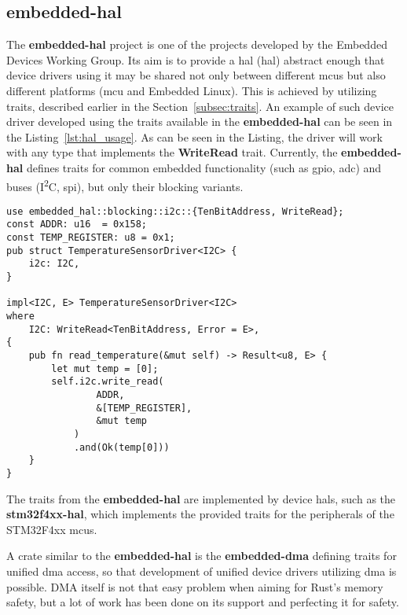 \subsection{embedded-hal}
\label{subsec:embedded_hal}
The \textbf{embedded-hal} project\cite{rust_embedded_devices_wg_rust-embeddedembedded-hal_2021} is one of the projects developed by the Embedded Devices Working Group.
Its aim is to provide a \acs{hal} (\acl{hal}) abstract enough that device drivers using it may be shared not only between different \acs{mcu}s but also different platforms (\acs{mcu} and Embedded Linux).
This is achieved by utilizing traits, described earlier in the Section~\ref{subsec:traits}.
An example of such device driver developed using the traits available in the \textbf{embedded-hal} can be seen in the Listing~\ref{lst:hal_usage}.
As can be seen in the Listing, the driver will work with any type that implements the \textbf{WriteRead} trait.
Currently, the \textbf{embedded-hal} defines traits for common embedded functionality (such as \acs{gpio}, \acs{adc}) and buses (I\textsuperscript{2}C, \acs{spi}), but only their blocking variants.

\begin{lstlisting}[caption={Example of an device driver utilizing embedded-hal traits\cite{rust_embedded_devices_wg_rust-embeddedembedded-hal_2021}.},label=lst:hal_usage]
use embedded_hal::blocking::i2c::{TenBitAddress, WriteRead};
const ADDR: u16  = 0x158;
const TEMP_REGISTER: u8 = 0x1;
pub struct TemperatureSensorDriver<I2C> {
    i2c: I2C,
}

impl<I2C, E> TemperatureSensorDriver<I2C>
where
    I2C: WriteRead<TenBitAddress, Error = E>,
{
    pub fn read_temperature(&mut self) -> Result<u8, E> {
        let mut temp = [0];
        self.i2c.write_read(
                ADDR,
                &[TEMP_REGISTER],
                &mut temp
            )
            .and(Ok(temp[0]))
    }
}
\end{lstlisting}

The traits from the \textbf{embedded-hal} are implemented by device \acs{hal}s, such as the \textbf{stm32f4xx-hal}\cite{noauthor_stm32-rsstm32f4xx-hal_2021}, which implements the provided traits for the peripherals of the STM32F4xx \acs{mcu}s.

A crate similar to the \textbf{embedded-hal} is the \textbf{embedded-dma} defining traits for unified \acs{dma} access, so that development of unified device drivers utilizing \acs{dma} is possible.
DMA itself is not that easy problem when aiming for Rust's memory safety\cite{aparicio_memory_nodate}, but a lot of work has been done on its support and perfecting it for safety.

